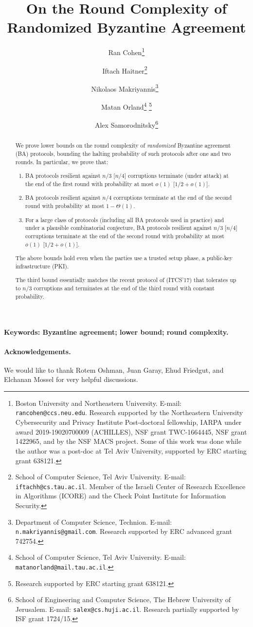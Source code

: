 \documentclass[11pt]{article}
\title{On the Round Complexity of Randomized Byzantine Agreement}
\author{Ran Cohen\thanks{Boston University and Northeastern University. E-mail: \texttt{rancohen@ccs.neu.edu}. Research supported by the Northeastern University Cybersecurity and Privacy Institute Post-doctoral fellowship, IARPA under award 2019-19020700009 (ACHILLES), NSF grant TWC-1664445, NSF grant 1422965, and by the NSF MACS project. Some of this work was done while the author was a post-doc at Tel Aviv University, supported by ERC starting grant 638121.}
\and Iftach Haitner\thanks{School of Computer Science, Tel Aviv University. E-mail: \texttt{iftachh@cs.tau.ac.il}. Member of the  Israeli Center of Research Excellence in Algorithms (ICORE) and the Check Point Institute for Information Security.}~\footnotemark[5] %
\and Nikolaos Makriyannis\thanks{Department of Computer Science, Technion. E-mail: \texttt{n.makriyannis@gmail.com}. Research supported by ERC advanced grant 742754.}~\footnotemark[5]
\and Matan Orland\thanks{School of Computer Science, Tel Aviv University. E-mail: \texttt{matanorland@mail.tau.ac.il}.}
\footnote{Research supported by ERC starting grant 638121.}
\and Alex Samorodnitsky\thanks{School of Engineering and Computer Science, The Hebrew University of Jerusalem.\newline{} E-mail: \texttt{salex@cs.huji.ac.il}. Research partially supported by ISF grant 1724/15.}
}
\begin{document}
\sloppy
\maketitle
\begin{abstract}
We prove lower bounds on the round complexity of \emph{randomized} Byzantine agreement (BA) protocols,
bounding the halting probability of such protocols after one and two rounds. In particular, we prove that:

\begin{enumerate}
\item BA protocols resilient against $n/3$ [\resp $n/4$] corruptions terminate (under attack) at the end of the first round with probability at most $o(1)$ [\resp $1/2+ o(1)$].

\item BA protocols resilient against $n/4$ corruptions terminate at the end of the second round with probability at most $1-\Theta(1)$.

\item For a large class of protocols (including all BA protocols used in practice) and under a plausible combinatorial conjecture, BA protocols resilient against $n/3$ [\resp $n/4$] corruptions terminate at the end of the second round with probability at most $o(1)$ [\resp $1/2 + o(1)$].
\end{enumerate}
The above bounds hold even when the parties use a trusted setup phase, \eg a public-key infrastructure (PKI).

The third bound essentially matches the recent protocol of \citeauthor{Micali17} (ITCS'17) that tolerates up to $n/3$ corruptions and terminates at the end of the third round with constant probability.
\end{abstract}

\vfill
\noindent\textbf{Keywords: Byzantine agreement; lower bound; round complexity.}

\Tableofcontents








\paragraph{Acknowledgements.}
We would like to thank Rotem Oshman, Juan Garay, Ehud Friedgut, and Elchanan Mossel for very helpful discussions.



\end{document}
